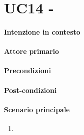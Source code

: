\section{UC14 - }\label{uc:14}
\paragraph{Intenzione in contesto}
\paragraph{Attore primario}
\paragraph{Precondizioni}
\paragraph{Post-condizioni}
\paragraph{Scenario principale}
\begin{enumerate}
    \item 
\end{enumerate}